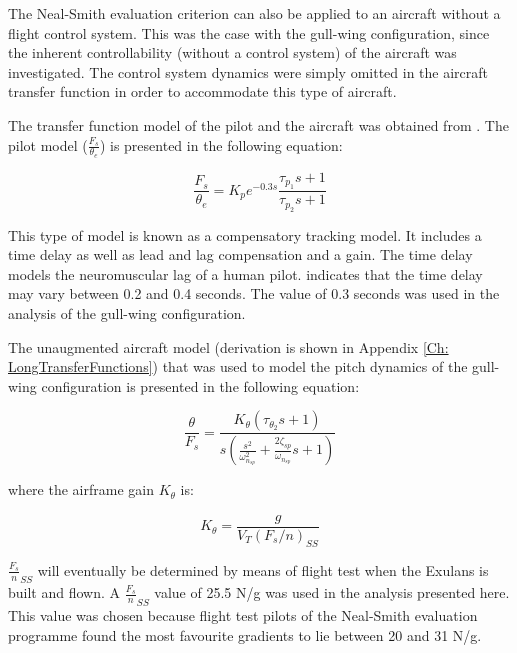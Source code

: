\documentclass{report}
\begin{document}
The Neal-Smith evaluation criterion can also be applied to an aircraft without a flight control system.  This was the case with the gull-wing configuration, since the inherent controllability (without a control system) of the aircraft was investigated.  The control system dynamics were simply omitted in the aircraft transfer function in order to accommodate this type of aircraft.

The transfer function model of the pilot and the aircraft was obtained from .  The pilot model ($\frac{F_s}{\theta_e}$) is presented in the following equation:


\begin{equation}
	\frac{F_s}{\theta_e} = K_p e^{-0.3s} \frac{\tau_{p_1}s + 1}{\tau_{p_2}s + 1}
\end{equation}

This type of model is known as a compensatory tracking model.  It includes a time delay as well as lead and lag compensation and a gain.  The time delay models the neuromuscular lag of a human pilot.  \cite{NealSmith} indicates that the time delay may vary between 0.2 and 0.4 seconds.  The value of 0.3 seconds was used in the analysis of the gull-wing configuration.

The unaugmented aircraft model (derivation is shown in Appendix \ref{Ch: LongTransferFunctions}) that was used to model the pitch dynamics of the gull-wing configuration is presented in the following equation:

\begin{equation}\label{Eq: AirframeTransfer}
	\frac{\theta}{F_s} = \frac{K_\theta (\tau_{\theta_2} s + 1)}{s(\frac{s^2}{\omega^2_{n_{sp}}} + \frac{2 \zeta_{sp}}{\omega_{n_{sp}}}s + 1)}
\end{equation}

where the airframe gain $K_\theta$ is:


\begin{equation}
	K_\theta = \frac{g}{V_T (F_s / n)_{SS}}
\end{equation}

$\frac{F_s}{n}_{SS}$ will eventually be determined by means of flight test when the Exulans is built and flown.  A $\frac{F_s}{n}_{SS}$ value of 25.5 N/g was used in the analysis presented here.  This value was chosen because flight test pilots of the Neal-Smith evaluation programme found the most favourite gradients to lie between 20 and 31 N/g. 
\end{document}
